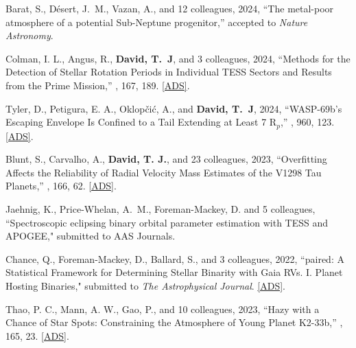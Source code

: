 \item {{Barat}, S.}, {{D\'esert}, J.~M.}, {{Vazan}, A.}, and 12 colleagues, 2024, ``The metal-poor atmosphere of a potential Sub-Neptune progenitor,'' accepted to \textit{Nature Astronomy}.

\item {{Colman}, I. L.}, {{Angus}, R.}, {\bf{{David}, T.~J}}, and 3 colleagues, 2024, ``{Methods for the Detection of Stellar Rotation Periods in Individual TESS Sectors and Results from the Prime Mission},'' \textit{\aj}, 167, 189. \href{https://ui.adsabs.harvard.edu/abs/2024AJ....167..189C}{[ADS]}.

\item {{Tyler}, D.}, {{Petigura}, E. A.}, {{Oklop{\v{c}}i{\'c}}, A.}, and {\bf{{David}, T.~J}}, 2024, ``{WASP-69b's Escaping Envelope Is Confined to a Tail Extending at Least 7 R$_p$},'' \textit{\apj}, 960, 123. \href{https://ui.adsabs.harvard.edu/abs/2024ApJ...960..123T}{[ADS]}.

\item {{Blunt}, S.}, {{Carvalho}, A.}, {\bf{{David}, T. J.}}, and 23 colleagues, 2023, ``{Overfitting Affects the Reliability of Radial Velocity Mass Estimates of the V1298 Tau Planets},'' \textit{\aj}, 166, 62. \href{https://ui.adsabs.harvard.edu/abs/2023AJ....166...62B}{[ADS]}.


\item {Jaehnig, K.}, {Price-Whelan, A.~M.}, {Foreman-Mackey, D.} and 5 colleagues, ``{Spectroscopic eclipsing binary orbital parameter estimation with TESS and APOGEE}," submitted to AAS Journals.

\item {{Chance}, Q., {Foreman-Mackey}, D.,  {Ballard}, S., and 3 colleagues}, 2022, ``{paired: A Statistical Framework for Determining Stellar Binarity with Gaia RVs. I. Planet Hosting Binaries}," submitted to \textit{The Astrophysical Journal}. \href{https://ui.adsabs.harvard.edu/abs/2022arXiv220611275C/abstract}{[ADS]}.


\item {{Thao}, P. C.}, {{Mann}, A. W.}, {{Gao}, P.}, and 10 colleagues, 2023, ``{Hazy with a Chance of Star Spots: Constraining the Atmosphere of Young Planet K2-33b},'' \textit{\aj}, 165, 23. \href{https://ui.adsabs.harvard.edu/abs/2023AJ....165...23T}{[ADS]}.

